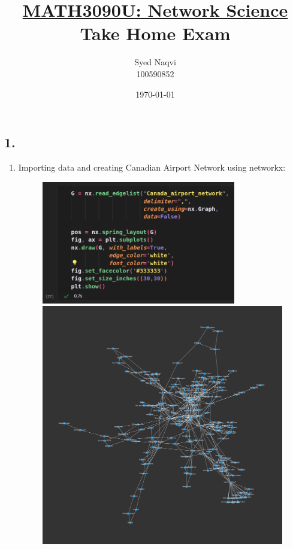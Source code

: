\documentclass{article}
\title{\textbf{\underline{MATH3090U: Network Science}\\Take Home Exam}}
\author{Syed Naqvi\\100590852}
\date{\today}
\begin{document}
    \maketitle
    
    \subsection*{1.}

    \begin{enumerate}[label=(\alph*), left=10pt, itemsep=10pt]
        
        \item \begin{minipage}[t]{0.9\textwidth}
            Importing data and creating Canadian Airport Network using networkx:
            \begin{figure}[H]
                \centering
                \includegraphics[width=0.8\textwidth, height=0.3\textheight]{./1a.png}
                \includegraphics[width=1\textwidth, height=0.4\textheight]{./1ai.png}
            \end{figure}
        \end{minipage}
        

\end{enumerate}
\end{document}
